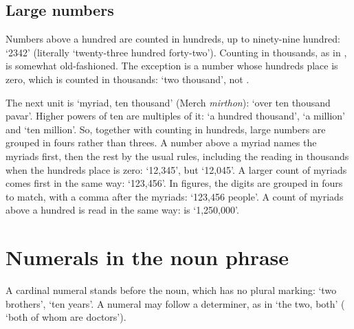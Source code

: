 \subsection{Large numbers}
Numbers above a hundred are counted in hundreds, up to ninety-nine hundred:  `2342' (literally `twenty-three hundred forty-two'). Counting in thousands, as in , is somewhat old-fashioned. The exception is a number whose hundreds place is zero, which is counted in thousands:  `two thousand', not .

The next unit is  `myriad, ten thousand' (Merch \textit{mirthon}):  `over ten thousand pavar'. Higher powers of ten are multiples of it:  `a hundred thousand',  `a million' and  `ten million'. So, together with counting in hundreds, large numbers are grouped in fours rather than threes. A number above a myriad names the myriads first, then the rest by the usual rules, including the reading in thousands when the hundreds place is zero:  `12,345', but  `12,045'. A larger count of myriads comes first in the same way:  `123,456'. In figures, the digits are grouped in fours to match, with a comma after the myriads:  `123,456 people'. A count of myriads above a hundred is read in the same way:  is  `1,250,000'.

\section{Numerals in the noun phrase}\label{sec:numerals-np}
A cardinal numeral stands before the noun, which has no plural marking:  `two brothers',  `ten years'. A numeral may follow a determiner, as in  `the two, both' ( `both of whom are doctors').

